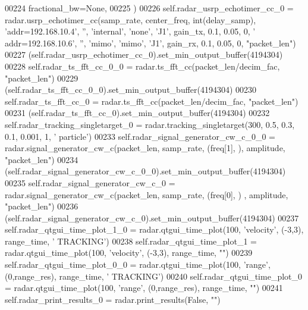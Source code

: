 \begin{DoxyCode}
00224                 fractional\_bw=\textcolor{keywordtype}{None},
00225         )
00226         self.radar_usrp_echotimer_cc_0 = radar.usrp\_echotimer\_cc(samp\_rate, center\_freq, 
      int(delay\_samp), \textcolor{stringliteral}{'addr=192.168.10.4'}, \textcolor{stringliteral}{''}, \textcolor{stringliteral}{'internal'}, \textcolor{stringliteral}{'none'}, \textcolor{stringliteral}{'J1'}, gain\_tx, 0.1, 0.05, 0, \textcolor{stringliteral}{'
      addr=192.168.10.6'}, \textcolor{stringliteral}{''}, \textcolor{stringliteral}{'mimo'}, \textcolor{stringliteral}{'mimo'}, \textcolor{stringliteral}{'J1'}, gain\_rx, 0.1, 0.05, 0, \textcolor{stringliteral}{"packet\_len"})
00227         (self.radar_usrp_echotimer_cc_0).set_min_output_buffer(4194304)
00228         self.radar_ts_fft_cc_0_0 = radar.ts\_fft\_cc(packet\_len/decim\_fac,  \textcolor{stringliteral}{"packet\_len"})
00229         (self.radar_ts_fft_cc_0_0).set_min_output_buffer(4194304)
00230         self.radar_ts_fft_cc_0 = radar.ts\_fft\_cc(packet\_len/decim\_fac,  \textcolor{stringliteral}{"packet\_len"})
00231         (self.radar_ts_fft_cc_0).set_min_output_buffer(4194304)
00232         self.radar_tracking_singletarget_0 = radar.tracking\_singletarget(300, 0.5, 0.3, 0.1, 0.001, 1, \textcolor{stringliteral}{'
      particle'})
00233         self.radar_signal_generator_cw_c_0_0 = radar.signal\_generator\_cw\_c(packet\_len, samp\_rate, (freq[1],
       ), amplitude, \textcolor{stringliteral}{"packet\_len"})
00234         (self.radar_signal_generator_cw_c_0_0).set_min_output_buffer(4194304)
00235         self.radar_signal_generator_cw_c_0 = radar.signal\_generator\_cw\_c(packet\_len, samp\_rate, (freq[0], )
      , amplitude, \textcolor{stringliteral}{"packet\_len"})
00236         (self.radar_signal_generator_cw_c_0).set_min_output_buffer(4194304)
00237         self.radar_qtgui_time_plot_1_0 = radar.qtgui\_time\_plot(100, \textcolor{stringliteral}{'velocity'}, (-3,3), range\_time, \textcolor{stringliteral}{'
      TRACKING'})
00238         self.radar_qtgui_time_plot_1 = radar.qtgui\_time\_plot(100, \textcolor{stringliteral}{'velocity'}, (-3,3), range\_time, \textcolor{stringliteral}{""})
00239         self.radar_qtgui_time_plot_0_0 = radar.qtgui\_time\_plot(100, \textcolor{stringliteral}{'range'}, (0,range\_res), range\_time, \textcolor{stringliteral}{'
      TRACKING'})
00240         self.radar_qtgui_time_plot_0 = radar.qtgui\_time\_plot(100, \textcolor{stringliteral}{'range'}, (0,range\_res), range\_time, \textcolor{stringliteral}{""})
00241         self.radar_print_results_0 = radar.print\_results(\textcolor{keyword}{False}, \textcolor{stringliteral}{""})

\end{DoxyCode}
